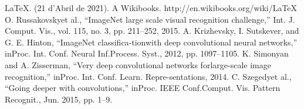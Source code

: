 ﻿\documentclass[10pt,a4paper,twocolumn,twoside]{article}
\begin{document}
\begin{thebibliography}{9}
 \LaTeX. (21 d'Abril de 2021). A Wikibooks. http://en.wikibooks.org/wiki/LaTeX
 O. Russakovskyet al., ``ImageNet large scale visual recognition challenge,'' Int. J. Comput. Vis., vol. 115, no. 3, pp. 211–252, 2015.
 A. Krizhevsky, I. Sutskever, and G. E. Hinton, ``ImageNet classifica-tionwith deep convolutional neural networks,'' inProc. Int. Conf. Neural Inf.Process. Syst., 2012, pp. 1097–1105.
 K. Simonyan and A. Zisserman, ``Very deep convolutional networks forlarge-scale image recognition,'' inProc. Int. Conf. Learn. Repre-sentations, 2014.
 C. Szegedyet al., ``Going deeper with convolutions,'' inProc. IEEE Conf.Comput. Vis. Pattern Recognit., Jun. 2015, pp. 1–9.
\end{thebibliography}
\end{document}
